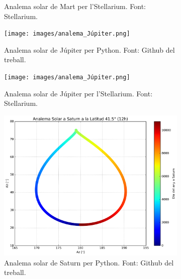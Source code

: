 \documentclass[a4paper, 11pt]{article}
\begin{document}
\begin{figure}[h!]
\begin{subfigure}{0.45\textwidth}
        \caption{Analema solar de Mart per l'Stellarium. Font: Stellarium.}
    \end{subfigure}
    \begin{subfigure}{0.45\textwidth}
        \centering
        \texttt{[image: images/analema\_Júpiter.png]}
        \caption{Analema solar de Júpiter per Python. Font: Github del treball.}
    \end{subfigure}
    \hspace{0.05\textwidth}
    \begin{subfigure}{0.45\textwidth}
        \centering
        \texttt{[image: images/analema\_Júpiter.png]}
        \caption{Analema solar de Júpiter per l'Stellarium. Font: Stellarium.}
    \end{subfigure}
    \begin{subfigure}{0.45\textwidth}
        \centering
        \includegraphics[width=\textwidth]{images/analema_Saturn.png}
        \caption{Analema solar de Saturn per Python. Font: Github del treball.}
    \end{subfigure}
    \hspace{0.05\textwidth}
    \begin{subfigure}{0.45\textwidth}
        \centering

\end{subfigure}
\end{figure}
\end{document}
